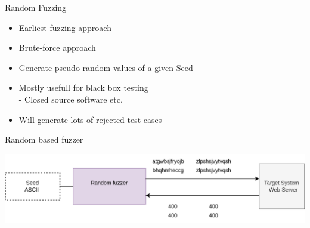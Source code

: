 \documentclass{beamer}
\begin{document}
\begin{frame}{Random Fuzzing}
 \begin{itemize}
 \item Earliest fuzzing approach
 \item Brute-force approach
  \item Generate pseudo random values of a given Seed
  \item Mostly usefull for black box testing\\
  - Closed source software etc.
    \item Will generate lots of rejected test-cases

 \end{itemize}

\end{frame}
\begin{frame}{Random based fuzzer}
\begin{center}
 \includegraphics[scale=0.15]{basic2.png}
 \end{center}
 \end{frame}
\end{document}
